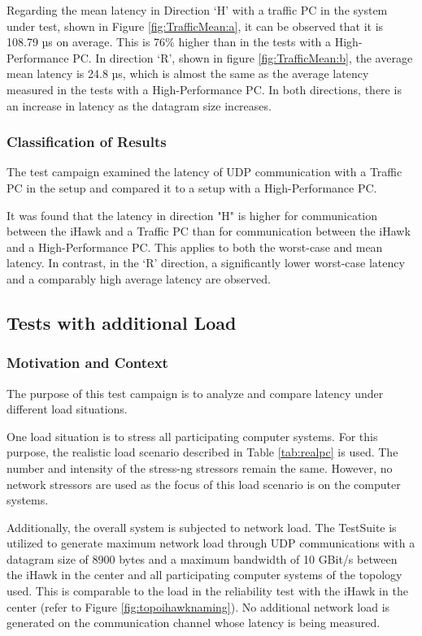 Regarding the mean latency in Direction `H' with a traffic PC in the system under test, shown in Figure \ref{fig:TrafficMean:a}, it can be observed that it is 108.79 µs on average. This is 76\% higher than in the tests with a High-Performance PC. In direction `R', shown in figure \ref{fig:TrafficMean:b}, the average mean latency is 24.8 µs, which is almost the same as the average latency measured in the tests with a High-Performance PC. In both directions, there is an increase in latency as the datagram size increases.

\subsubsection{Classification of Results}
The test campaign examined the latency of UDP communication with a Traffic PC in the setup and compared it to a setup with a High-Performance PC.

It was found that the latency in direction "H" is higher for communication between the iHawk and a Traffic PC than for communication between the iHawk and a High-Performance PC. This applies to both the worst-case and mean latency. In contrast, in the `R' direction, a significantly lower worst-case latency and a comparably high average latency are observed.


\subsection{Tests with additional Load}
\subsubsection{Motivation and Context}
The purpose of this test campaign is to analyze and compare latency under different load situations.

One load situation is to stress all participating computer systems. For this purpose, the realistic load scenario described in Table \ref{tab:realpc} is used. The number and intensity of the stress-ng stressors remain the same. However, no network stressors are used as the focus of this load scenario is on the computer systems.

Additionally, the overall system is subjected to network load. The TestSuite is utilized to generate maximum network load through UDP communications with a datagram size of 8900 bytes and a maximum bandwidth of 10 GBit/s between the iHawk in the center and all participating computer systems of the topology used. This is comparable to the load in the reliability test with the iHawk in the center (refer to Figure \ref{fig:topoihawknaming}). No additional network load is generated on the communication channel whose latency is being measured.

